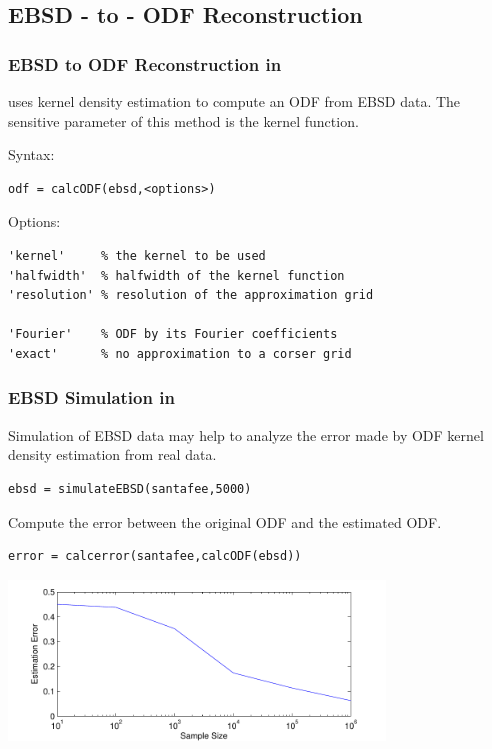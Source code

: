 \subsection*{EBSD - to - ODF Reconstruction}


\begin{frame}[fragile]
  \frametitle{EBSD to ODF Reconstruction in \MTEX}

  \mtex uses kernel density estimation to compute an ODF from EBSD data. The
  sensitive parameter of this method is the kernel function.

\medskip

  Syntax:
  \begin{alertenv}
\begin{lstlisting}
odf = calcODF(ebsd,<options>)
\end{lstlisting}
  \end{alertenv}

Options:
\begin{lstlisting}
'kernel'     % the kernel to be used
'halfwidth'  % halfwidth of the kernel function
'resolution' % resolution of the approximation grid

'Fourier'    % ODF by its Fourier coefficients
'exact'      % no approximation to a corser grid
\end{lstlisting}


\end{frame}


\begin{frame}[fragile]
  \frametitle{EBSD Simulation in \mtex}

  Simulation of EBSD data may help to analyze the error made by ODF kernel
  density estimation from real data.

\begin{lstlisting}
ebsd = simulateEBSD(santafee,5000)
\end{lstlisting}

Compute the error between the original ODF and the estimated ODF.
\begin{lstlisting}
error = calcerror(santafee,calcODF(ebsd))
\end{lstlisting}

      \centerline{
      \includegraphics[width=10cm]{pic/ebsdcorrectness}}

\end{frame}





